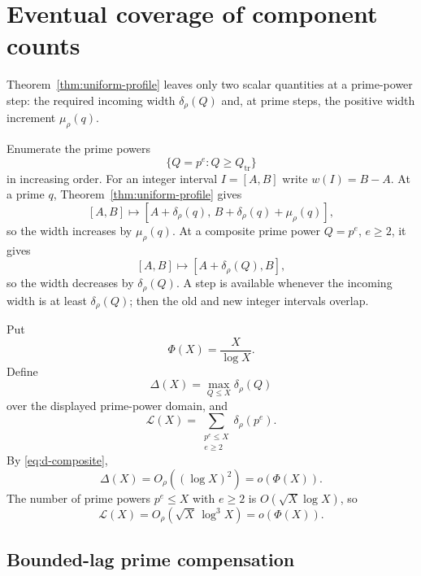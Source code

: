 \section{Eventual coverage of component counts}
\label{sec:scalar-finality}

Theorem~\ref{thm:uniform-profile} leaves only two scalar quantities at a prime-power step: the required incoming width $\delta_\rho(Q)$ and, at prime steps, the positive width increment $\mu_\rho(q)$.

Enumerate the prime powers
\[
\{Q=p^e:Q\ge Q_{\mathrm{tr}}\}
\]
in increasing order.  For an integer interval $I=[A,B]$ write $w(I)=B-A$.  At a prime $q$, Theorem~\ref{thm:uniform-profile} gives
\begin{equation}\label{eq:prime-action}
[A,B]\longmapsto
[A+\delta_\rho(q),\,B+\delta_\rho(q)+\mu_\rho(q)],
\end{equation}
so the width increases by $\mu_\rho(q)$.  At a composite prime power $Q=p^e$, $e\ge2$, it gives
\begin{equation}\label{eq:composite-action}
[A,B]\longmapsto[A+\delta_\rho(Q),B],
\end{equation}
so the width decreases by $\delta_\rho(Q)$.  A step is available whenever the incoming width is at least $\delta_\rho(Q)$; then the old and new integer intervals overlap.

Put
\[
\Phi(X)=\frac X{\log X}.
\]
Define
\[
\Delta(X)=\max_{Q\le X}\delta_\rho(Q)
\]
over the displayed prime-power domain, and
\begin{equation}\label{eq:cumulative-debt}
\mathcal L(X)=
\sum_{\substack{p^e\le X\\ e\ge2}}\delta_\rho(p^e).
\end{equation}
By \eqref{eq:d-composite},
\begin{equation}\label{eq:max-demand-subscale}
\Delta(X)=O_\rho((\log X)^2)=o(\Phi(X)).
\end{equation}
The number of prime powers $p^e\le X$ with $e\ge2$ is $O(\sqrt X\log X)$, so
\begin{equation}\label{eq:debt-subscale}
\mathcal L(X)=O_\rho(\sqrt X\,\log^3X)=o(\Phi(X)).
\end{equation}

\subsection{Bounded-lag prime compensation}

